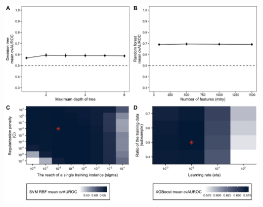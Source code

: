 \documentclass[11pt,]{article}
\begin{document}
\includegraphics[height=30cm, width=15cm]{Figure_S2.png}
\end{document}
